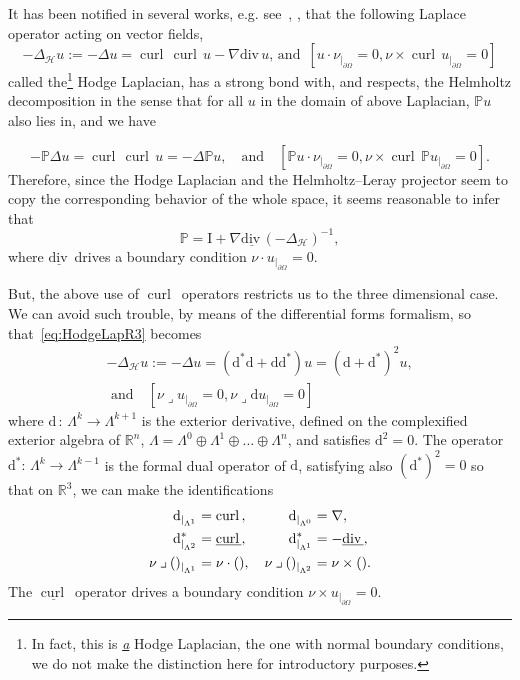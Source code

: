 \documentclass[10pt]{amsart}
\theoremstyle{definition}\newtheorem{defi}[theo]{Definition}\newtheorem{rema}[theo]{Remark}\newtheorem{exam}[theo]{Example}\newtheorem{exem}[theo]{Example}\newtheorem{nota}[theo]{Notation}
\renewcommand*{\div}{\mathrm{div\,}}
\DeclareMathOperator{\curl}{curl\,}
\newcommand{\bbP}{\mathbb{P}}
\newcommand{\bbR}{\mathbb{R}}
\newcommand{\rmd}{\mathrm{d}}
\newcommand{\rmI}{\mathrm{I}}
\newcommand{\clH}{\mathcal{H}}
\newcommand{\iprod}{\mathbin{\lrcorner}}
\begin{document}
It has been notified in several works, e.g. see~\cite[Introduction]{GeissertHeckTrunk2013}, \cite[Section~4]{MonniauxShen2018}, that the following Laplace operator acting on vector fields,
\begin{equation}\label{eq:HodgeLapR3}
-\Delta_{\clH}u:=-\Delta u = \curl \curl u - \nabla \div u \text{, and }\, \left[u\cdot\nu_{|_{\partial\Omega}} = 0, \nu\times\curl u_{|_{\partial\Omega}} = 0\right]
\end{equation}
called the\footnote{In fact, this is \underline{\emph{a}} Hodge Laplacian, the one with normal boundary conditions, we do not make the distinction here for introductory purposes.} Hodge Laplacian, has a strong bond with, and respects, the Helmholtz decomposition in the sense that for all $u$ in the domain of above Laplacian, $\bbP u$ also lies in, and we have

\[
-\bbP\Delta u = \curl \curl u = -\Delta \bbP u,\quad\text{and}\quad \left[\bbP u\cdot\nu_{|_{\partial\Omega}} = 0,  \nu\times\curl \bbP u_{|_{\partial\Omega}} = 0\right].
\]
Therefore, since the Hodge Laplacian and the Helmholtz--Leray projector seem to copy the corresponding behavior of the whole space, it seems reasonable to infer that
\begin{equation}\label{eq:HodgeHelmotzLerayProj1}
\bbP = \rmI  +\nabla\underline{\div}
(-\Delta_{\clH})^{-1},
\end{equation}
where $\underline{\div}$ drives a boundary condition $\nu \cdot u_{|_{\partial\Omega}} =0$.

But, the above use of $\curl$ operators restricts us to the three dimensional case. We can avoid such trouble, by means of the differential forms formalism, so that~\eqref{eq:HodgeLapR3} becomes
\begin{multline}\label{eq:HodgeLapdefIntro}
-\Delta_{\clH}u:=-\Delta u = \left(\rmd^\ast \rmd + \rmd \rmd^\ast\right) u = \left(\rmd+\rmd^\ast\right)^2 u,\\
 \text{ and}\quad \left[\nu\iprod u_{|_{\partial\Omega}} = 0, \nu\iprod \rmd u_{|_{\partial\Omega}} = 0\right]
\end{multline}
where $\rmd\,:\,\Lambda^{k}\longrightarrow\Lambda^{k+1}$ is the exterior derivative, defined on the complexified exterior algebra of $\bbR^n$, $\Lambda = \Lambda^0 \oplus \Lambda^1 \oplus \ldots \oplus \Lambda^n$, and satisfies $\rmd^2=0$. The operator $\rmd^\ast:\,\Lambda^{k}\longrightarrow\Lambda^{k-1}$ is the formal dual operator of $\rmd$, satisfying also $(\rmd^\ast)^2=0$ so that on $\bbR^3$, we can make the identifications
\begin{align*}
\rmd_{|_{\Lambda^{1}}} &= \curl, \mkern53mu\rmd_{|_{\Lambda^{0}}} = \nabla,\\
\rmd^{\ast}_{|_{\Lambda^{2}}} &= \underline{\curl}, \mkern53mu \rmd^\ast_{|_{\Lambda^{1}}} = -\underline{\div},\\
\nu\iprod ()_{|_{\Lambda^{1}}} &= \nu \cdot (),   \quad \nu\iprod ()_{|_{\Lambda^{2}}} = \nu\times () .
\end{align*}
The $\underline{\curl}$ operator drives a boundary condition $\nu\times
u_{|_{\partial\Omega}}=0$.
\end{document}
